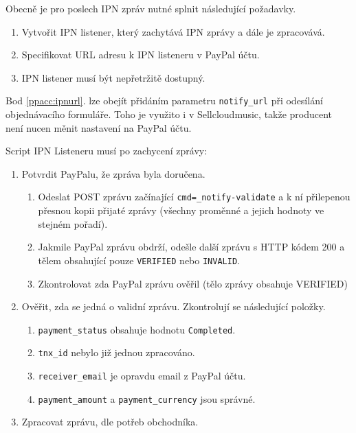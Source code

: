 \documentclass[12pt]{article}
\begin{document}
Obecně je pro poslech IPN zpráv nutné splnit následující požadavky.

\begin{enumerate}
\item Vytvořit IPN listener, který zachytává IPN zprávy a dále je zpracovává.
\item \label{ppacc:ipnurl} Specifikovat URL adresu k IPN listeneru v PayPal účtu.
\item IPN listener musí být nepřetržitě dostupný.
\end{enumerate}

Bod \ref{ppacc:ipnurl}. lze obejít přidáním parametru \texttt{notify\_url} při odesílání objednávacího formuláře. Toho je využito i v Sellcloudmusic, takže producent není nucen měnit nastavení na PayPal účtu.\newline

Script IPN Listeneru musí po zachycení zprávy:

\begin{enumerate}
\item Potvrdit PayPalu, že zpráva byla doručena.

  \begin{enumerate}
  \item Odeslat POST zprávu začínající \texttt{cmd=\_notify-validate} a k ní přilepenou přesnou kopii přijaté zprávy (všechny proměnné a jejich hodnoty ve stejném pořadí).
  \item Jakmile PayPal zprávu obdrží, odešle další zprávu s HTTP kódem 200 a tělem obsahující pouze \texttt{VERIFIED} nebo \texttt{INVALID}.
  \item Zkontrolovat zda PayPal zprávu ověřil (tělo zprávy obsahuje VERIFIED)
  \end{enumerate}

\item Ověřit, zda se jedná o validní zprávu. Zkontrolují se následující položky.

  \begin{enumerate}
  \item \texttt{payment\_status} obsahuje hodnotu \texttt{Completed}.
  \item \texttt{tnx\_id} nebylo již jednou zpracováno.
  \item \texttt{receiver\_email} je opravdu email z PayPal účtu.
  \item \texttt{payment\_amount} a \texttt{payment\_currency} jsou správné.
  \end{enumerate}

\item Zpracovat zprávu, dle potřeb obchodníka.
\end{enumerate}
\end{document}
